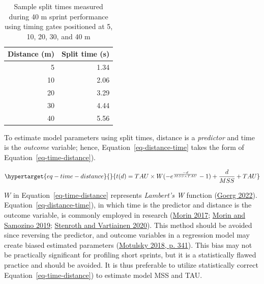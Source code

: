 \documentclass[
  letterpaper,
  DIV=11,
  numbers=noendperiod]{scrartcl}
\begin{document}
\hypertarget{tbl-example-split-times}{}
\begin{table}
\caption{\label{tbl-example-split-times}Sample split times measured during 40 m sprint performance using timing
gates positioned at 5, 10, 20, 30, and 40 m }\tabularnewline

\centering
\begin{tabular}{r|r}
\hline
Distance (m) & Split time (s)\\
\hline
5 & 1.34\\
\hline
10 & 2.06\\
\hline
20 & 3.29\\
\hline
30 & 4.44\\
\hline
40 & 5.56\\
\hline
\end{tabular}
\end{table}

To estimate model parameters using split times, distance is a
\emph{predictor} and time is the \emph{outcome} variable; hence,
Equation~\ref{eq-distance-time} takes the form of
Equation~\ref{eq-time-distance}).

\begin{equation}\protect\hypertarget{eq-time-distance}{}{
  t(d) = TAU \times W(-e^{\frac{-d}{MSS \times TAU}} - 1) + \frac{d}{MSS} + TAU
}\label{eq-time-distance}\end{equation}

\(W\) in Equation~\ref{eq-time-distance} represents \emph{Lambert's W}
function (\protect\hyperlink{ref-R-LambertW}{Goerg 2022}).
Equation~\ref{eq-distance-time}), in which time is the predictor and
distance is the outcome variable, is commonly employed in research
(\protect\hyperlink{ref-morinSpreadsheetSprintAcceleration2017}{Morin
2017};
\protect\hyperlink{ref-morinSpreadsheetSprintAcceleration2019}{Morin and
Samozino 2019};
\protect\hyperlink{ref-stenrothSpreadsheetSprintAcceleration2020}{Stenroth
and Vartiainen 2020}). This method should be avoided since reversing the
predictor, and outcome variables in a regression model may create biased
estimated parameters
(\protect\hyperlink{ref-motulskyIntuitiveBiostatisticsNonmathematical2018}{Motulsky
2018, p. 341}). This bias may not be practically significant for
profiling short sprints, but it is a statistically flawed practice and
should be avoided. It is thus preferable to utilize statistically
correct Equation~\ref{eq-time-distance}) to estimate model MSS and TAU.
\end{document}
